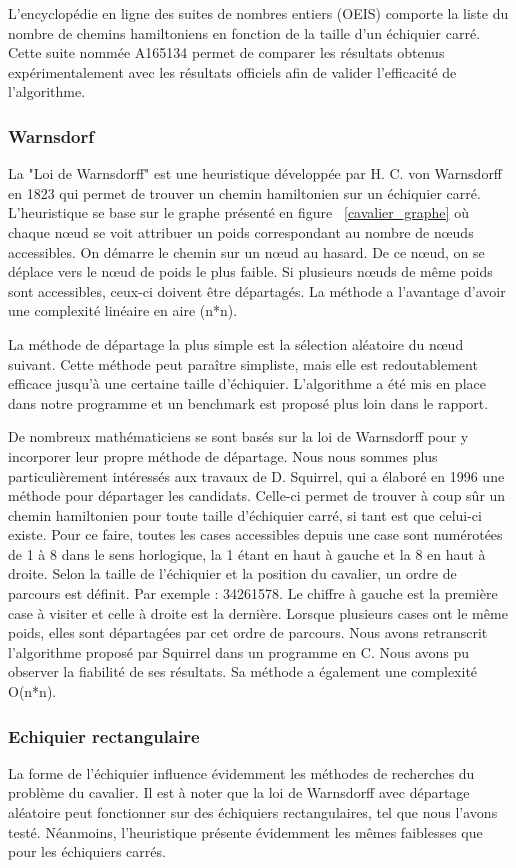 L'encyclopédie en ligne des suites de nombres entiers (OEIS) comporte la liste du nombre de chemins hamiltoniens en fonction de la taille d’un échiquier carré. Cette suite nommée A165134 permet de comparer les résultats obtenus expérimentalement avec les résultats officiels afin de valider l’efficacité de l’algorithme.
\subsubsection{Warnsdorf}
La "Loi de Warnsdorff" est une heuristique développée par H. C. von Warnsdorff en 1823 qui permet de trouver un chemin hamiltonien sur un échiquier carré. L'heuristique se base sur le graphe présenté en figure ~\ref{cavalier_graphe} où chaque nœud se voit attribuer un poids correspondant au nombre de nœuds accessibles. On démarre le chemin sur un nœud au hasard. De ce nœud, on se déplace vers le nœud de poids le plus faible. Si plusieurs nœuds de même poids sont accessibles, ceux-ci doivent être départagés. La méthode a l'avantage d'avoir une complexité linéaire en aire (n*n). 

La méthode de départage la plus simple est la sélection aléatoire du nœud suivant. Cette méthode peut paraître simpliste, mais elle est redoutablement efficace jusqu'à une certaine taille d'échiquier. L'algorithme a été mis en place dans notre programme et un benchmark est proposé plus loin dans le rapport.

De nombreux mathématiciens se sont basés sur la loi de Warnsdorff pour y incorporer leur propre méthode de départage. Nous nous sommes plus particulièrement intéressés aux travaux de D. Squirrel, qui a élaboré en 1996 une méthode pour départager les candidats. Celle-ci permet de trouver à coup sûr un chemin hamiltonien pour toute taille d'échiquier carré, si tant est que celui-ci existe. Pour ce faire, toutes les cases accessibles depuis une case sont numérotées de 1 à 8 dans le sens horlogique, la 1 étant en haut à gauche et la 8 en haut à droite. Selon la taille de l'échiquier et la position du cavalier, un ordre de parcours est définit. Par exemple : 34261578. Le chiffre à gauche est la première case à visiter et celle à droite est la dernière. Lorsque plusieurs cases ont le même poids, elles sont départagées par cet ordre de parcours. Nous avons retranscrit l'algorithme proposé par Squirrel dans un programme en C. Nous avons pu observer la fiabilité de ses résultats. Sa méthode a également une complexité O(n*n).
\subsubsection{Echiquier rectangulaire}
La forme de l'échiquier influence évidemment les méthodes de recherches du problème du cavalier. Il est à noter que la loi de Warnsdorff avec départage aléatoire peut fonctionner sur des échiquiers rectangulaires, tel que nous l'avons testé. Néanmoins, l'heuristique présente évidemment les mêmes faiblesses que pour les échiquiers carrés.

